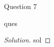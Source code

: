 \begin{solution}{Question 7}\label{ques:7}
    \begin{question}
        ques
    \end{question}
    \tcblower{}
    \begin{proof}[Solution]
        sol
    \end{proof}
\end{solution}
